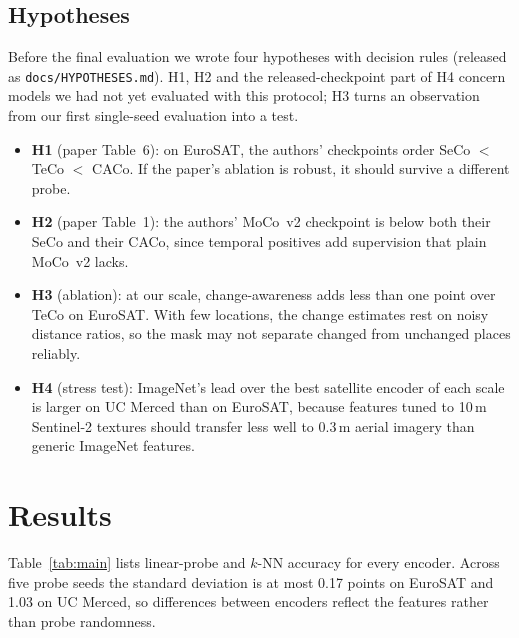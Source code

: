 \documentclass[conference]{IEEEtran}
\begin{document}
\subsection{Hypotheses}
Before the final evaluation we wrote four hypotheses with decision rules
(released as \texttt{docs/HYPOTHESES.md}). H1, H2 and the released-checkpoint
part of H4 concern models we had not yet evaluated with this protocol; H3 turns
an observation from our first single-seed evaluation into a test.
\begin{itemize}
\item \textbf{H1} (paper Table~6): on EuroSAT, the authors' checkpoints order
SeCo $<$ TeCo $<$ CACo. If the paper's ablation is robust, it should survive a
different probe.
\item \textbf{H2} (paper Table~1): the authors' MoCo~v2 checkpoint is below both
their SeCo and their CACo, since temporal positives add supervision that plain
MoCo~v2 lacks.
\item \textbf{H3} (ablation): at our scale, change-awareness adds less than one
point over TeCo on EuroSAT. With few locations, the change estimates rest on
noisy distance ratios, so the mask may not separate changed from unchanged
places reliably.
\item \textbf{H4} (stress test): ImageNet's lead over the best satellite encoder
of each scale is larger on UC Merced than on EuroSAT, because features tuned to
10\,m Sentinel-2 textures should transfer less well to 0.3\,m aerial imagery
than generic ImageNet features.
\end{itemize}

\section{Results}
Table~\ref{tab:main} lists linear-probe and $k$-NN accuracy for every encoder.
Across five probe seeds the standard deviation is at most 0.17 points on
EuroSAT and 1.03 on UC Merced, so differences between encoders reflect the
features rather than probe randomness.
\end{document}
